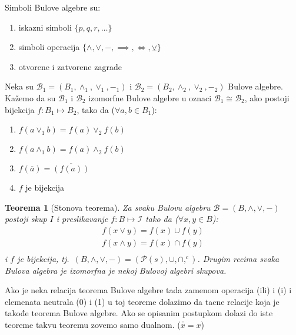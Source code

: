 \documentclass[12p,14paper]{article}
\newtheorem*{theorem}{Teorema}
\begin{document}
\begin{multicols}{2}
    Simboli Bulove algebre su:
    \begin{enumerate}
        \itemsep0em
        \item iskazni simboli $\{ p, q, r, \ldots \}$
        \item simboli operacija $\{ \land, \lor, -, \implies, \iff, \veebar \}$
        \item otvorene i zatvorene zagrade
    \end{enumerate}

    Neka su $\mathcal{B}_1 = (B_1, \land_1, \lor_1, -_1)$ i 
    $\mathcal{B}_2 = (B_2, \land_2, \lor_2, -_2)$ Bulove algebre. Kažemo da su 
    $\mathcal{B}_1$ i $\mathcal{B}_2$ izomorfne Bulove algebre u oznaci 
    $\mathcal{B}_1 \cong \mathcal{B}_2$, ako postoji bijekcija $f : B_1 \mapsto B_2$, tako da ($\forall a, b \in B_1$):
    \begin{enumerate}{}
        \itemsep0em
        \item $f(a \lor_1 b) = f(a) \lor_2 f(b)$
        \item $f(a \land_1 b) = f(a) \land_2 f(b)$
        \item $f(\overline{a}) = \overline{(f(a))}$
        \item $f$ je bijekcija
    \end{enumerate}

    \begin{theorem}[Stonova teorema]
        Za svaku Bulovu algebru $\mathcal{B} = (B, \land, \lor, -)$ postoji 
        skup $I$ i preslikavanje $f : B \mapsto \mathcal{I}$ tako da 
        ($\forall x,y \in B$):
        \[
            \begin{align*}
                f(x \lor y) = f(x) \cup f(y) \\
                f(x \land y) = f(x) \cap f(y) \\
            \end{align*}
        \]
        i $f$ je bijekcija, tj.\ 
        $(B, \land, \lor, -) = (\mathcal{P}(s), \cup, \cap, ^{c})$.
        Drugim recima svaka Bulova algebra je izomorfna je nekoj Bulovoj
        algebri skupova.
    \end{theorem}

    Ako je neka relacija teorema Bulove algebre tada zamenom operacija (ili) i 
    (i) i elemenata neutrala (0) i (1) u toj teoreme dolazimo da tacne 
    relacije koja je takođe teorema Bulove algebre. Ako se opisanim postupkom 
    dolazi do iste teoreme takvu teoremu zovemo samo dualnom. 
    ($\overline{\overline{x}} = x$)


\end{multicols}
\end{document}
